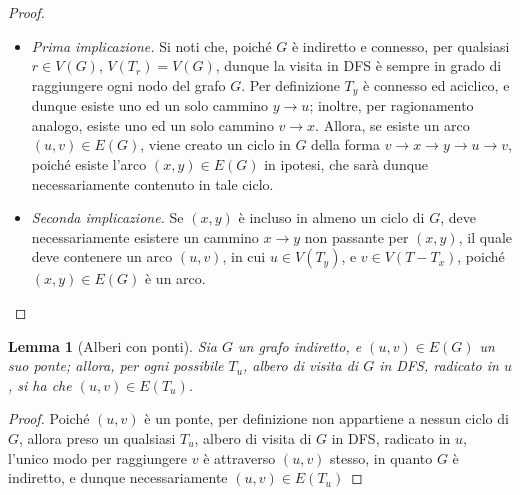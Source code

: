 \documentclass[14pt]{extreport}
\newtheorem{lemma}{Lemma}[subsection]
\theoremstyle{definition}
\theoremstyle{definition}
\begin{document}
\begin{proof}
    \hspace{0.7cm}
    \begin{itemize}
        \item[] \textit{Prima implicazione.} Si noti che, poiché $G$ è indiretto e connesso, per qualsiasi $r \in V(G)$, $V(T_r) = V(G)$, dunque la visita in DFS è sempre in grado di raggiungere ogni nodo del grafo $G$.
            Per definizione $T_y$ è connesso ed aciclico, e dunque esiste uno ed un solo cammino $y \rightarrow u$; inoltre, per ragionamento analogo, esiste uno ed un solo cammino $v \rightarrow x$. Allora, se esiste un arco $(u, v) \in E(G)$, viene creato un ciclo in $G$ della forma $v \rightarrow x \rightarrow y \rightarrow u \rightarrow v$, poiché esiste l'arco $(x, y) \in E(G)$ in ipotesi, che sarà dunque necessariamente contenuto in tale ciclo.
        \item[] \textit{Seconda implicazione.}  Se $(x, y)$ è incluso in almeno un ciclo di $G$, deve necessariamente esistere un cammino $x \rightarrow y$ non passante per $(x, y)$, il quale deve contenere un arco $(u, v)$, in cui $u \in V(T_y)$, e $v \in V(T - T_x)$, poiché $(x, y) \in E(G)$ è un arco.

    \end{itemize}
\end{proof}

\begin{lemma}[Alberi con ponti]
    Sia $G$ un grafo indiretto, e $(u, v) \in E(G)$ un suo ponte; allora, per ogni possibile $T_u$, albero di visita di $G$ in DFS, radicato in $u$, si ha che $(u, v) \in E(T_u)$.
\end{lemma}

\begin{proof}
    Poiché $(u, v)$ è un ponte, per definizione non appartiene a nessun ciclo di $G$, allora preso un qualsiasi $T_u$, albero di visita di $G$ in DFS, radicato in $u$, l'unico modo per raggiungere $v$ è attraverso $(u, v)$ stesso, in quanto $G$ è indiretto, e dunque necessariamente $(u, v) \in E(T_u)$
\end{proof}
\end{document}
